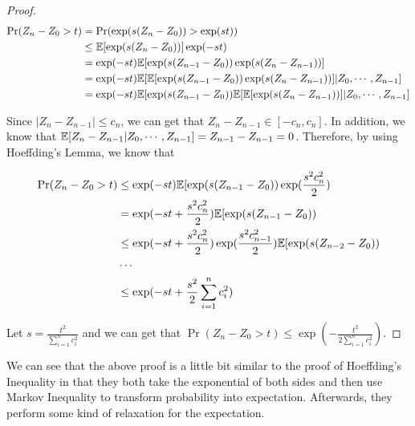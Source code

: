 \documentclass[../main.tex]{subfiles}
\begin{document}
\begin{proof}
	\begin{equation*}
		\begin{aligned}
			\Pr(Z_n - Z_0 > t) &= \Pr(\exp(s(Z_n - Z_0)) > \exp(st)) \\
			& \leq \mathbb{E}[\exp(s(Z_n - Z_0))] \exp(-st) \\
			& = \exp(-st)  \mathbb{E}[\exp(s(Z_{n-1} - Z_{0}))\exp(s(Z_n - Z_{n-1}))] \\
			& = \exp(-st)  \mathbb{E}[\mathbb{E}[\exp(s(Z_{n-1} - Z_{0}))\exp(s(Z_n - Z_{n-1}))] | Z_0, \cdots ,Z_{n-1}] \\
			& = \exp(-st) \mathbb{E}[\exp(s(Z_{n-1} - Z_{0})) \mathbb{E}[\mathbb{E}[\exp(s(Z_n - Z_{n-1}))] | Z_0, \cdots ,Z_{n-1}] 
		\end{aligned}
	\end{equation*}
	
	Since $|Z_n - Z_{n-1}| \leq c_n$, we can get that $Z_n - Z_{n-1} \in [-c_n, c_n]$. In addition, we know that $\mathbb{E}[Z_n - Z_{n-1} | Z_0, \cdots, Z_{n-1}] = Z_{n-1} - Z_{n-1} = 0$. Therefore, by using Hoeffding's Lemma, we know that 
	
	\begin{equation*}
		\begin{aligned}
		\Pr(Z_n - Z_0 > t) & \leq \exp(-st) \mathbb{E}[\exp(s(Z_{n-1} - Z_{0})) \exp(\frac{s^2c_n^2}{2}) \\
		& =  \exp(-st + \frac{s^2c_n^2}{2}) \mathbb{E}[\exp(s(Z_{n-1} - Z_{0})) \\
		& \leq \exp(-st + \frac{s^2c_n^2}{2}) \exp(\frac{s^2c_{n-1}^2}{2}) \mathbb{E}[\exp(s(Z_{n-2} - Z_{0}))  \\
		& \cdots \\
		& \leq \exp(-st + \frac{s^2}{2}\sum\limits_{i=1}^n c_i^2)
		\end{aligned}
	\end{equation*}
	
	Let $s = \frac{t^2}{\sum\limits_{i = 1}^n c_i^2}$ and we can get that $	\Pr(Z_n - Z_0 > t) \leq \exp(-\frac{t^2}{2 \sum\limits_{i = 1}^n c_i^2})$.
\end{proof}

We can see that the above proof is a little bit similar to the proof of Hoeffding's Inequality in that they both take the exponential of both sides and then use Markov Inequality to transform probability into expectation. Afterwards, they perform some kind of relaxation for the expectation.
\end{document}
